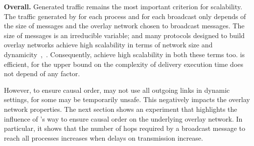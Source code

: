\noindent \textbf{Overall.}  Generated traffic remains the most important
criterion for scalability. The traffic generated by \CBROADCAST for each process
and for each broadcast only depends of the size of messages and the overlay
network chosen to broadcast messages. The size of messages is an irreducible
variable; and many protocols designed to build overlay networks achieve high
scalability in terms of network size and
dynamicity~\cite{bertier-d2ht,jelasity2007gossip,jelasity2009tman},~\cite{nedelec2017adaptive,voulgaris2005cyclon}.
Consequently, \CBROADCAST achieve high scalability in both these terms
too. \CBROADCAST is efficient, for the upper bound on the complexity of delivery
execution time does not depend of any factor.

However, to ensure causal order, \CBROADCAST may not use all outgoing links in
dynamic settings, for some may be temporarily unsafe. This negatively impacts
the overlay network properties. The next section shows an experiment that
highlights the influence of \CBROADCAST's way to ensure causal order on the
underlying overlay network. In particular, it shows that the number of hops
required by a broadcast message to reach all processes increases when delays on
transmission increase.







